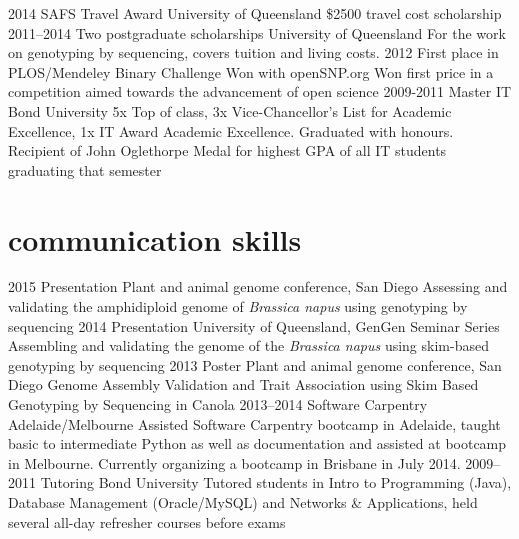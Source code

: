 \documentclass[]{friggeri-cv} %
\begin{document}
\begin{entrylist}
\entry
{2014}
{SAFS Travel Award}
{University of Queensland}
{\$2500 travel cost scholarship}
\entry
{2011--2014}
{Two postgraduate scholarships}
{University of Queensland}
{For the work on genotyping by sequencing, covers tuition and living costs.}
\entry
{2012}
{First place in PLOS/Mendeley Binary Challenge}
{Won with openSNP.org}
{Won first price in a competition aimed towards the advancement of open science}
\entry
{2009-2011}
{Master IT}
{Bond University}
{5x Top of class,  3x Vice-Chancellor's List for Academic Excellence, 1x IT Award Academic Excellence. Graduated with honours. Recipient of John Oglethorpe Medal for highest GPA of all IT students graduating that semester}
\end{entrylist}


\newpage
\section{communication skills}

\begin{entrylist}
\entry
{2015}
{Presentation}
{Plant and animal genome conference, San Diego}
{Assessing and validating the amphidiploid genome of \textit{Brassica napus} using genotyping by sequencing}
\entry
{2014}
{Presentation}
{University of Queensland, GenGen Seminar Series}
{Assembling and validating the genome of the \textit{Brassica napus} using skim-based genotyping by sequencing}
\entry
{2013}
{Poster}
{Plant and animal genome conference, San Diego}
{Genome Assembly Validation and Trait Association using Skim Based Genotyping by Sequencing in Canola}
\entry
{2013--2014}
{Software Carpentry}
{Adelaide/Melbourne}
{Assisted Software Carpentry bootcamp in Adelaide, taught basic to intermediate Python as well as documentation and assisted at bootcamp in Melbourne. Currently organizing a bootcamp in Brisbane in July 2014.}
\entry
{2009--2011}
{Tutoring}
{Bond University}
{Tutored students in Intro to Programming (Java), Database Management (Oracle/MySQL) and Networks \& Applications, held several all-day refresher courses before exams}
\end{entrylist}
\end{document}
